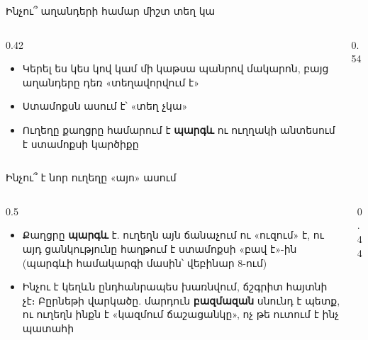\begin{frame}{Ինչու՞ աղանդերի համար միշտ տեղ կա}
  \begin{columns}[c]
    \begin{column}{0.42\textwidth}
      \begin{itemize}
        \item Կերել ես կես կով կամ մի կաթսա պանրով մակարոն, բայց աղանդերը դեռ «տեղավորվում է»
        \item<2-> Ստամոքսն ասում է՝ «տեղ չկա»
        \item<3-> Ուղեղը քաղցրը համարում է \textbf{պարգև} ու ուղղակի անտեսում է ստամոքսի կարծիքը
      \end{itemize}
    \end{column}
    \begin{column}{0.54\textwidth}
      \centering
    \end{column}
  \end{columns}
\end{frame}

\begin{frame}{Ինչու՞ է նոր ուղեղը «այո» ասում}
  \begin{columns}[T]
    \begin{column}{0.5\textwidth}
      \begin{itemize}
        \item<1-> Քաղցրը \textbf{պարգև} է. ուղեղն այն ճանաչում ու «ուզում» է, ու այդ ցանկությունը հաղթում է ստամոքսի «բավ է»-ին {\small(պարգևի համակարգի մասին՝ վեբինար 8-ում)}
        \item<2-> Ինչու է կեղևն ընդհանրապես խառնվում, ճշգրիտ հայտնի չէ։ Բըրնեթի վարկածը. մարդուն \textbf{բազմազան} սնունդ է պետք, ու ուղեղն ինքն է «կազմում ճաշացանկը», ոչ թե ուտում է ինչ պատահի
      \end{itemize}
    \end{column}
    \begin{column}{0.44\textwidth}
    \end{column}
  \end{columns}
\end{frame}

